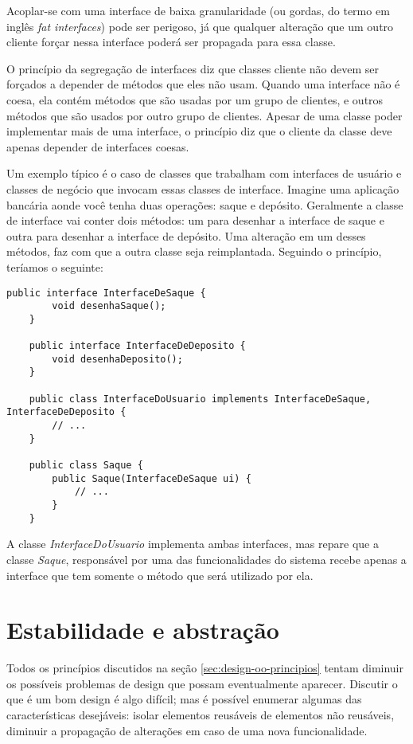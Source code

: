 Acoplar-se com uma interface de baixa granularidade (ou gordas, do termo
em inglês \textit{fat interfaces}) pode ser perigoso, já que qualquer alteração
que um outro cliente forçar nessa interface poderá ser propagada para essa
classe.

O princípio da segregação de interfaces diz que classes cliente não devem ser
forçados a depender de métodos que eles não usam. Quando uma interface não é
coesa, ela contém métodos que são usadas por um grupo de clientes, e outros 
métodos que são usados por outro grupo de clientes. Apesar de uma classe poder 
implementar mais de uma interface, o princípio diz que o cliente da classe  deve
apenas depender de interfaces coesas.

Um exemplo típico é o caso de classes que trabalham com interfaces de usuário e
classes  de negócio que invocam essas classes de interface. Imagine uma
aplicação bancária aonde você tenha duas operações: saque e depósito. Geralmente
a classe de interface vai conter dois métodos: um para desenhar a interface de
saque e outra para desenhar a interface de depósito. Uma alteração em um desses 
métodos, faz com que a outra classe seja reimplantada. Seguindo o princípio, 
teríamos o seguinte:

\begin{lstlisting}[frame=trbl]
	public interface InterfaceDeSaque {
		void desenhaSaque();
	}
	
	public interface InterfaceDeDeposito {
		void desenhaDeposito();
	}
	
	public class InterfaceDoUsuario implements InterfaceDeSaque, InterfaceDeDeposito {
		// ...
	}
	
	public class Saque {
		public Saque(InterfaceDeSaque ui) { 
			// ...
		}
	}
\end{lstlisting}

A classe \textit{InterfaceDoUsuario} implementa ambas interfaces, mas repare 
que a classe \textit{Saque}, responsável por uma das funcionalidades do sistema 
recebe apenas a interface que tem somente o método que será utilizado por ela.

\section{Estabilidade e abstração}
\label{sec:estabilidade-e-abstracao}

Todos os princípios discutidos na seção \ref{sec:design-oo-principios} tentam
diminuir os possíveis problemas de design que possam eventualmente aparecer.
Discutir o que é um bom design é algo difícil; mas é possível enumerar algumas
das características desejáveis: isolar elementos reusáveis de elementos não
reusáveis, diminuir a propagação de alterações em caso de uma nova
funcionalidade.

